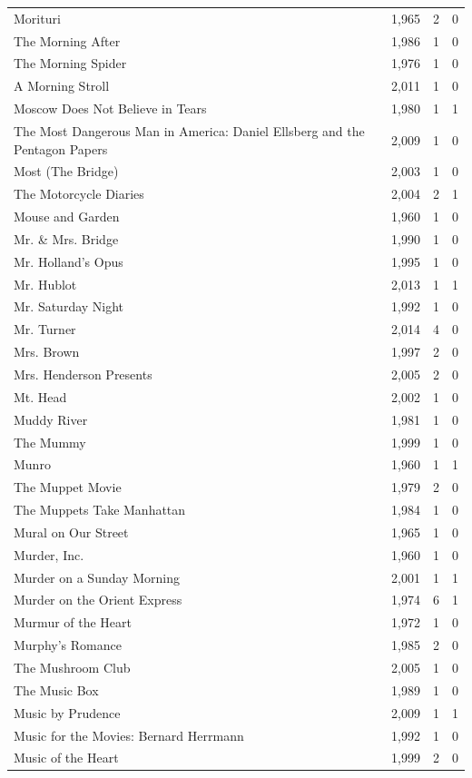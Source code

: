 \begin{tabular}{lrrr}
Morituri & 1,965 & 2 & 0 \\
The Morning After & 1,986 & 1 & 0 \\
The Morning Spider & 1,976 & 1 & 0 \\
A Morning Stroll & 2,011 & 1 & 0 \\
Moscow Does Not Believe in Tears & 1,980 & 1 & 1 \\
The Most Dangerous Man in America: Daniel Ellsberg and the Pentagon Papers & 2,009 & 1 & 0 \\
Most (The Bridge) & 2,003 & 1 & 0 \\
The Motorcycle Diaries & 2,004 & 2 & 1 \\
Mouse and Garden & 1,960 & 1 & 0 \\
Mr. \& Mrs. Bridge & 1,990 & 1 & 0 \\
Mr. Holland's Opus & 1,995 & 1 & 0 \\
Mr. Hublot & 2,013 & 1 & 1 \\
Mr. Saturday Night & 1,992 & 1 & 0 \\
Mr. Turner & 2,014 & 4 & 0 \\
Mrs. Brown & 1,997 & 2 & 0 \\
Mrs. Henderson Presents & 2,005 & 2 & 0 \\
Mt. Head & 2,002 & 1 & 0 \\
Muddy River & 1,981 & 1 & 0 \\
The Mummy & 1,999 & 1 & 0 \\
Munro & 1,960 & 1 & 1 \\
The Muppet Movie & 1,979 & 2 & 0 \\
The Muppets Take Manhattan & 1,984 & 1 & 0 \\
Mural on Our Street & 1,965 & 1 & 0 \\
Murder, Inc. & 1,960 & 1 & 0 \\
Murder on a Sunday Morning & 2,001 & 1 & 1 \\
Murder on the Orient Express & 1,974 & 6 & 1 \\
Murmur of the Heart & 1,972 & 1 & 0 \\
Murphy's Romance & 1,985 & 2 & 0 \\
The Mushroom Club & 2,005 & 1 & 0 \\
The Music Box & 1,989 & 1 & 0 \\
Music by Prudence & 2,009 & 1 & 1 \\
Music for the Movies: Bernard Herrmann & 1,992 & 1 & 0 \\
Music of the Heart & 1,999 & 2 & 0 \\

\end{tabular}
